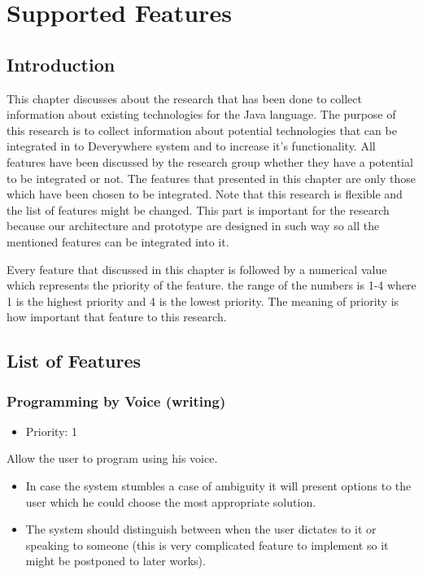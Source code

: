 \chapter{Supported Features}
\section{Introduction}
This chapter discusses about the research that has been done to collect information about existing technologies for the Java language. The purpose of this research is to collect information about potential technologies that can be integrated in to Deverywhere system and to increase it's functionality. All features have been discussed by the research group whether they have a potential to be integrated or not. The features that presented in this chapter are only those which have been chosen to be integrated. Note that this research is flexible and the list of features might be changed. This part is important for the research because our architecture and prototype are designed in such way so all the mentioned features can be integrated into it.

Every feature that discussed in this chapter is followed by a numerical value which represents the priority of the feature. the range of the numbers is 1-4 where 1 is the highest priority and 4 is the lowest priority. The meaning of priority is how important that feature to this research.

\section{List of Features}
\subsection{Programming by Voice (writing)}
\begin{itemize}
	\item Priority: 1
\end{itemize}
Allow the user to program using his voice.
\begin{itemize}
	\item In case the system stumbles a case of ambiguity it will present options to the user which he could choose the most appropriate solution.
	\item The system should distinguish between when the user dictates to it or speaking to someone (this is very complicated feature to implement so it might be postponed to later works).
\end{itemize}
